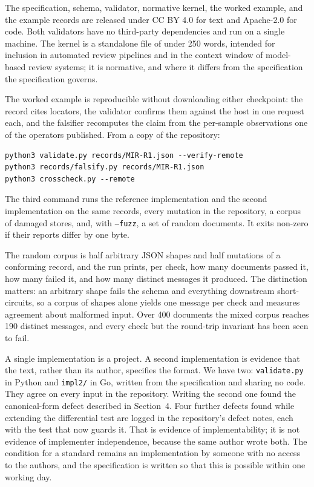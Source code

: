 \documentclass[11pt]{article}
\begin{document}
The specification, schema, validator, normative kernel, the worked example, and
the example records are released under CC BY 4.0 for text and Apache-2.0 for
code. Both validators have no third-party dependencies and run on a single
machine. The kernel is a standalone file of under 250 words, intended for
inclusion in automated review pipelines and in the context window of
model-based review systems; it is normative, and where it differs from the
specification the specification governs.

The worked example is reproducible without downloading either checkpoint: the
record cites locators, the validator confirms them against the host in one
request each, and the falsifier recomputes the claim from the per-sample
observations one of the operators published. From a copy of the repository:

\begin{verbatim}
python3 validate.py records/MIR-R1.json --verify-remote
python3 records/falsify.py records/MIR-R1.json
python3 crosscheck.py --remote
\end{verbatim}

The third command runs the reference implementation and the second
implementation on the same records, every mutation in the repository, a corpus
of damaged stores, and, with \texttt{--fuzz}, a set of random documents. It
exits non-zero if their reports differ by one byte.

The random corpus is half arbitrary JSON shapes and half mutations of a
conforming record, and the run prints, per check, how many documents passed it,
how many failed it, and how many distinct messages it produced. The distinction
matters: an arbitrary shape fails the schema and everything downstream
short-circuits, so a corpus of shapes alone yields one message per check and
measures agreement about malformed input. Over 400 documents the mixed corpus
reaches 190 distinct messages, and every check but the round-trip invariant has
been seen to fail.

A single implementation is a project. A second implementation is evidence that
the text, rather than its author, specifies the format. We have two:
\texttt{validate.py} in Python and \texttt{impl2/} in Go, written from the
specification and sharing no code. They agree on every input in the repository.
Writing the second one found the canonical-form defect described in
Section~4. Four further defects found while extending the differential test are
logged in the repository's defect notes, each with the test that now guards it.
That is evidence of implementability; it is not evidence of
implementer independence, because the same author wrote both. The condition for
a standard remains an implementation by someone with no access to the authors,
and the specification is written so that this is possible within one working
day.
\end{document}
